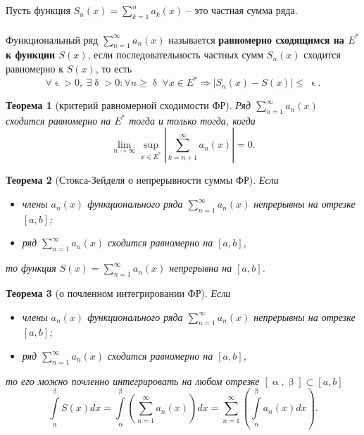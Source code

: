 \documentclass[a4paper, 12pt]{report}
\numberwithin{equation}{section}
\renewcommand{\leq}{\leqslant}
\renewcommand{\geq}{\geqslant}
\renewcommand{\alpha}{\upalpha}
\renewcommand{\beta}{\upbeta}
\renewcommand{\delta}{\updelta}
\renewcommand{\epsilon}{\upvarepsilon}
\newtheorem*{theorem}{Теорема}
\begin{document}
	\\\\
	Пусть функция $S_n(x) = \sum\limits_{k=1}^n a_k(x)$ -- это частная сумма ряда. 
	\\\\
	Функциональный ряд $\sum\limits_{n=1}^\infty a_n(x)$ называется \textbf{равномерно сходящимся на $E^*$ к функции $S(x)$}, если последовательность частных сумм $S_n(x)$ сходится равномерно к $S(x)$, то есть
	\begin{equation*}
		\forall \epsilon > 0,\ \exists \delta > 0: \forall n \geq \delta\ \forall x \in E^* \Rightarrow|S_n(x) - S(x) | \leq\ \epsilon.
	\end{equation*}
	\begin{theorem}
		[критерий равномерной сходимости ФР]
		Ряд $\sum_{n=1}^{\infty} a_n(x)$ сходится равномерно на $E^*$ тогда и только тогда, когда
		\begin{equation*}
			\lim\limits_{n\to\infty}\underset{x \in E^*}{\sup}\left|\sum\limits_{k=n+1}^\infty a_n(x)\right| = 0.
		\end{equation*}
	\end{theorem}
	\begin{theorem}
		[Стокса-Зейделя о непрерывности суммы ФР]
		Если
		\begin{itemize}
			\item члены $a_n(x)$ функционального ряда $\sum_{n=1}^\infty a_n(x)$ непрерывны на отрезке $[a,b]$;
			\item ряд $\sum_{n=1}^\infty a_n(x)$ сходится равномерно на $[a,b]$,
		\end{itemize} 
		то функция $S(x) = \sum_{n=1}^\infty a_n(x)$ непрерывна на $[a,b]$.
	\end{theorem}
	\begin{theorem}
		[о почленном интегрировании ФР]
		Если 
		\begin{itemize}
			\item члены $a_n(x)$ функционального ряда $\sum_{n=1}^\infty a_n(x)$ непрерывны на отрезке $[a,b]$;
			\item ряд $\sum_{n=1}^\infty a_n(x)$ сходится равномерно на $[a,b]$,
		\end{itemize} 
		то его можно почленно интегрировать на любом отрезке $[\alpha, \beta]\subset [a,b]$
		\begin{equation}
			\int\limits_\alpha^\beta S(x)dx = \int\limits_\alpha^\beta \left( \sum_{n=1}^\infty a_n(x)\right)dx = \sum_{n=1}^\infty \left(\int\limits_\alpha^\beta a_n(x) dx \right).
		\end{equation}
	\end{theorem}
\end{document}

